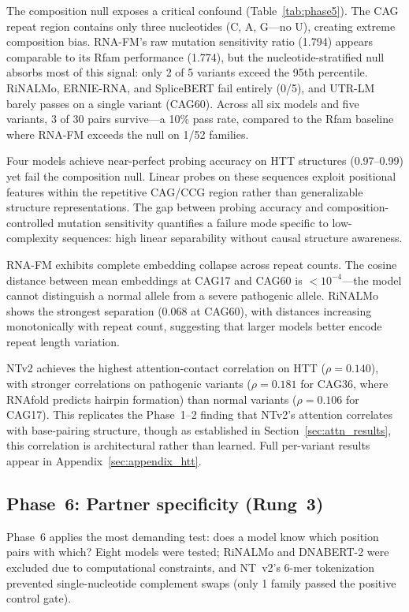 \documentclass[11pt]{article}
\begin{document}
The composition null exposes a critical confound
(Table~\ref{tab:phase5}).  The CAG repeat region contains only
three nucleotides (C, A, G---no U), creating extreme composition
bias.  RNA-FM's raw mutation sensitivity ratio (1.794) appears
comparable to its Rfam performance (1.774), but the
nucleotide-stratified null absorbs most of this signal: only 2 of 5
variants exceed the 95th percentile.  RiNALMo, ERNIE-RNA, and
SpliceBERT fail entirely (0/5), and UTR-LM barely passes on a
single variant (CAG60).  Across all six models and five variants,
3 of 30 pairs survive---a 10\% pass rate, compared to the
Rfam baseline where RNA-FM exceeds the null on 1/52 families.

Four models achieve near-perfect probing accuracy on HTT structures
(0.97--0.99) yet fail the composition null.  Linear probes
on these sequences exploit positional features within the repetitive
CAG/CCG region rather than generalizable structure representations.
The gap between probing accuracy and composition-controlled
mutation sensitivity quantifies a failure mode specific to
low-complexity sequences: high linear separability without causal
structure awareness.

RNA-FM exhibits complete embedding collapse across repeat counts.
The cosine distance between mean embeddings at CAG17 and CAG60 is
$< 10^{-4}$---the model cannot distinguish a normal allele from a
severe pathogenic allele.  RiNALMo shows the strongest separation
(0.068 at CAG60), with distances increasing monotonically with
repeat count, suggesting that larger models better encode repeat
length variation.

NTv2 achieves the highest attention-contact correlation on HTT
($\rho = 0.140$), with stronger correlations on pathogenic variants
($\rho = 0.181$ for CAG36, where RNAfold predicts hairpin formation)
than normal variants ($\rho = 0.106$ for CAG17).  This replicates
the Phase~1--2 finding that NTv2's attention correlates with
base-pairing structure, though as established in Section~\ref{sec:attn_results},
this correlation is architectural rather than learned.
Full per-variant results appear in Appendix~\ref{sec:appendix_htt}.


\subsection{Phase~6: Partner specificity (Rung~3)}
\label{sec:rung3_results}

Phase~6 applies the most demanding test: does a model know which
position pairs with which?  Eight models were tested; RiNALMo and
DNABERT-2 were excluded due to computational constraints, and
NT~v2's 6-mer tokenization prevented single-nucleotide complement
swaps (only 1 family passed the positive control gate).
\end{document}
